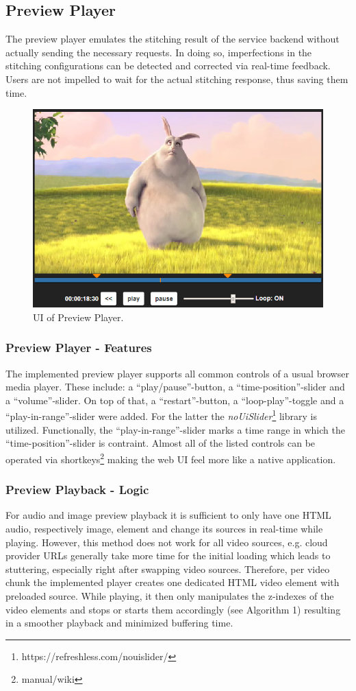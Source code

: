 \documentclass[conference]{IEEEtran}
\begin{document}
\subsection{Preview Player}
The preview player emulates the stitching result of the service backend without actually sending the necessary requests.
In doing so, imperfections in the stitching configurations can be detected and corrected via real-time feedback.
Users are not impelled to wait for the actual stitching response, thus saving them time.
\begin{figure}[H]
\centering
\includegraphics[scale=0.5]{preview_player.png}
\caption{UI of Preview Player.}
\end{figure}
\subsubsection{Preview Player - Features}
The implemented preview player supports all common controls of a usual browser media player.
These include: a ``play/pause''-button, a ``time-position''-slider and a ``volume''-slider.
On top of that, a ``restart''-button, a ``loop-play''-toggle and a ``play-in-range''-slider were added.
For the latter the \textit{noUiSlider}\footnote{https://refreshless.com/nouislider/} library is utilized.
Functionally, the ``play-in-range''-slider marks a time range in which the ``time-position''-slider is contraint.
Almost all of the listed controls can be operated via shortkeys\footnote{manual/wiki} making the web UI feel more like a native application.
\\
\subsubsection{Preview Playback - Logic}
For audio and image preview playback it is sufficient to only have one HTML audio, respectively image, element and change its sources in real-time while playing.
However, this method does not work for all video sources, e.g. cloud provider URLs generally take more time for the initial loading which leads to stuttering, especially right after swapping video sources.
Therefore, per video chunk the implemented player creates one dedicated HTML video element with preloaded source.
While playing, it then only manipulates the z-indexes of the video elements and stops or starts them accordingly (see Algorithm 1) resulting in a smoother playback and minimized buffering time.
\end{document}
